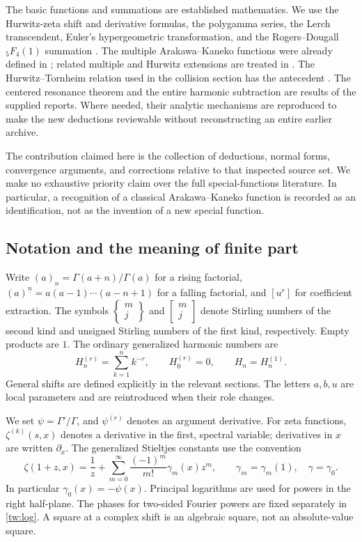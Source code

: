 \documentclass[11pt,a4paper]{article}
\numberwithin{equation}{section}
\theoremstyle{definition}
\theoremstyle{remark}
\begin{document}
The basic functions and summations are established mathematics.
We use the Hurwitz-zeta shift and derivative formulas, the
polygamma series, the Lerch transcendent, Euler's hypergeometric
transformation, and the Rogers--Dougall ${}_5F_4(1)$ summation
\cite{DLMFHurwitz,DLMFPolygamma,DLMFLerch,DLMFHypergeom,DLMFDougall}.
The multiple Arakawa--Kaneko functions were already defined in
\cite{AK1999}; related multiple and Hurwitz extensions are treated
in \cite{KT2018,CC2010}. The Hurwitz--Tornheim relation used in the
collision section has the antecedent \cite{EspinosaMoll}.
The centered resonance theorem and the entire harmonic subtraction
are results of the supplied reports. Where needed, their analytic
mechanisms are reproduced to make the new deductions reviewable
without reconstructing an entire earlier archive.

The contribution claimed here is the collection of deductions,
normal forms, convergence arguments, and corrections relative to
that inspected source set. We make no exhaustive priority claim
over the full special-functions literature. In particular, a
recognition of a classical Arakawa--Kaneko function is recorded as
an identification, not as the invention of a new special function.

\subsection{Notation and the meaning of finite part}

Write $(a)_n=\Gamma(a+n)/\Gamma(a)$ for a rising factorial,
$(a)^{\underline n}=a(a-1)\cdots(a-n+1)$ for a falling factorial,
and $[u^r]$ for coefficient extraction. The symbols
$\left\{\begin{smallmatrix}m\\j\end{smallmatrix}\right\}$ and
$\left[\begin{smallmatrix}m\\j\end{smallmatrix}\right]$ denote
Stirling numbers of the second kind and unsigned Stirling numbers
of the first kind, respectively. Empty products are $1$.
The ordinary generalized harmonic numbers are
\[
 H_n^{(r)}=\sum_{k=1}^n k^{-r},\qquad H_0^{(r)}=0,
 \qquad H_n=H_n^{(1)}.
\]
General shifts are defined explicitly in the relevant sections.
The letters $a,b,u$ are local parameters and are reintroduced
when their role changes.

We set $\psi=\Gamma'/\Gamma$, and $\psi^{(r)}$ denotes an
argument derivative. For zeta functions, $\zeta^{(k)}(s,x)$
denotes a derivative in the first, spectral variable; derivatives
in $x$ are written $\partial_x$. The generalized Stieltjes
constants use the convention
\begin{equation}\label{scope:stieltjes}
 \zeta(1+z,x)=\frac1z+
       \sum_{m=0}^{\infty}\frac{(-1)^m}{m!}\gamma_m(x)z^m,
 \qquad \gamma_m=\gamma_m(1),\quad \gamma=\gamma_0.
\end{equation}
In particular $\gamma_0(x)=-\psi(x)$.
Principal logarithms are used for powers in the right half-plane.
The phases for two-sided Fourier powers are fixed separately
in \eqref{tw:log}. A square at a complex shift is an algebraic
square, not an absolute-value square.
\end{document}
